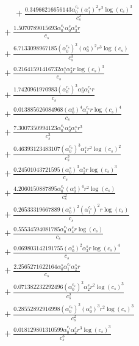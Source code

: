 \documentclass[10pt]{article}
\begin{document}
\begin{align*}
\phantom{R_{0,7}} &\phantom{={}}{}  + \frac{0.34966216656143 \alpha_{0}^{c_s} \left(\alpha_{1}^s\right)^{2} r^{2} \log{\left(c_{s} \right)}^{3}}{c_{s}^{2}} \\
&{}  + \frac{1.5070789015693 \alpha_{0}^{c_s} \alpha_{0}^s \alpha_{3}^s r}{c_{s}} \\
&{}  + \frac{6.7133098967185 \left(\alpha_{0}^{c_s}\right)^{2} \left(\alpha_{0}^s\right)^{2} r^{3} \log{\left(c_{s} \right)}}{c_{s}^{3}} \\
&{}  + \frac{0.21641591416732 \alpha_{1}^s \alpha_{3}^s r \log{\left(c_{s} \right)}^{3}}{c_{s}} \\
&{}  + \frac{1.7420961970983 \left(\alpha_{0}^{c_s}\right)^{3} \alpha_{0}^s \alpha_{1}^{c_s} r}{c_{s}} \\
&{}  + \frac{0.013885626084968 \left(\alpha_{0}^s\right)^{4} \alpha_{1}^{c_s} r \log{\left(c_{s} \right)}^{4}}{c_{s}} \\
&{}  + \frac{7.3007350994123 \alpha_{0}^{c_s} \alpha_{0}^s \alpha_{1}^s r^{3}}{c_{s}^{3}} \\
&{}  + \frac{0.46393123483107 \left(\alpha_{0}^{c_s}\right)^{3} \alpha_{1}^s r^{2} \log{\left(c_{s} \right)}^{2}}{c_{s}^{2}} \\
&{}  + \frac{0.24501043721595 \left(\alpha_{0}^s\right)^{3} \alpha_{2}^s r \log{\left(c_{s} \right)}^{3}}{c_{s}} \\
&{}  + \frac{4.2060150887895 \alpha_{0}^{c_s} \left(\alpha_{0}^s\right)^{4} r^{2} \log{\left(c_{s} \right)}}{c_{s}^{2}} \\
&{}  + \frac{0.26533319667889 \left(\alpha_{0}^s\right)^{2} \left(\alpha_{1}^{c_s}\right)^{2} r \log{\left(c_{s} \right)}}{c_{s}} \\
&{}  + \frac{0.55534594081785 \alpha_{0}^{c_s} \alpha_{4}^s r \log{\left(c_{s} \right)}}{c_{s}} \\
&{}  + \frac{0.069803142191755 \left(\alpha_{0}^s\right)^{2} \alpha_{3}^s r \log{\left(c_{s} \right)}^{4}}{c_{s}} \\
&{}  + \frac{2.2565271622164 \alpha_{0}^s \alpha_{1}^{c_s} \alpha_{2}^s r}{c_{s}} \\
&{}  + \frac{0.071382232292496 \left(\alpha_{0}^{c_s}\right)^{2} \alpha_{2}^s r^{2} \log{\left(c_{s} \right)}^{3}}{c_{s}^{2}} \\
&{}  + \frac{0.28552892916998 \left(\alpha_{0}^{c_s}\right)^{2} \left(\alpha_{0}^s\right)^{3} r^{2} \log{\left(c_{s} \right)}^{3}}{c_{s}^{2}} \\
&{}  + \frac{0.018129801310599 \alpha_{0}^{c_s} \alpha_{2}^s r^{3} \log{\left(c_{s} \right)}^{3}}{c_{s}^{3}} \\

\end{align*}
\end{document}
